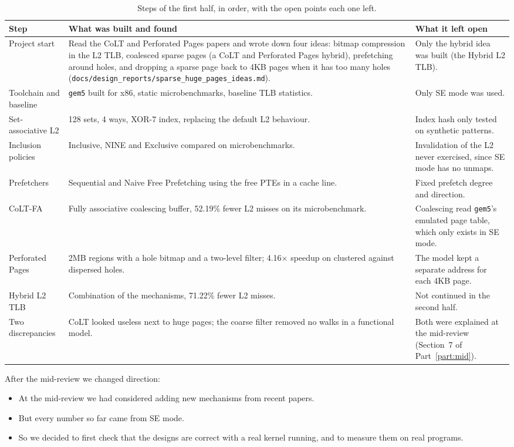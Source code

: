 \begin{table}[htbp]
\centering
\small
\caption{Steps of the first half, in order, with the open points each one left.}
\label{tab:chr_phase1}
\begin{tabularx}{\textwidth}{>{\raggedright\arraybackslash}p{3.2cm} X X}
\toprule
\textbf{Step} & \textbf{What was built and found} & \textbf{What it left open} \\
\midrule
Project start & Read the CoLT and Perforated Pages papers and wrote down four ideas: bitmap compression in the L2 TLB, coalesced sparse pages (a CoLT and Perforated Pages hybrid), prefetching around holes, and dropping a sparse page back to 4KB pages when it has too many holes (\texttt{docs/design\_reports/sparse\_huge\_pages\_ideas.md}). & Only the hybrid idea was built (the Hybrid L2 TLB). \\
Toolchain and baseline & \texttt{gem5} built for x86, static microbenchmarks, baseline TLB statistics. & Only SE mode was used. \\
Set-associative L2 & 128 sets, 4 ways, XOR-7 index, replacing the default L2 behaviour. & Index hash only tested on synthetic patterns. \\
Inclusion policies & Inclusive, NINE and Exclusive compared on microbenchmarks. & Invalidation of the L2 never exercised, since SE mode has no unmaps. \\
Prefetchers & Sequential and Naive Free Prefetching using the free PTEs in a cache line. & Fixed prefetch degree and direction. \\
CoLT-FA & Fully associative coalescing buffer, 52.19\% fewer L2 misses on its microbenchmark. & Coalescing read \texttt{gem5}'s emulated page table, which only exists in SE mode. \\
Perforated Pages & 2MB regions with a hole bitmap and a two-level filter; 4.16$\times$ speedup on clustered against dispersed holes. & The model kept a separate address for each 4KB page. \\
Hybrid L2 TLB & Combination of the mechanisms, 71.22\% fewer L2 misses. & Not continued in the second half. \\
Two discrepancies & CoLT looked useless next to huge pages; the coarse filter removed no walks in a functional model. & Both were explained at the mid-review (Section~7 of Part~\ref{part:mid}). \\
\bottomrule
\end{tabularx}
\end{table}

\noindent After the mid-review we changed direction:
\begin{itemize}
    \item At the mid-review we had considered adding new mechanisms from recent papers.
    \item But every number so far came from SE mode.
    \item So we decided to first check that the designs are correct with a real kernel running, and to measure them on real programs.
\end{itemize}

